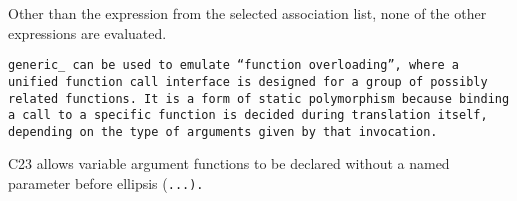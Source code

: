 Other than the expression from the selected association list,
none of the other expressions are evaluated.

\example \tt{generic_} can be used to emulate ``function overloading'',
where a unified function call interface is
designed for a group of possibly related functions.
It is a form of static polymorphism because binding a call
to a specific function is decided during translation itself,
depending on the type of arguments given by that invocation.


\note C23 allows variable argument functions to be declared
without a named parameter before ellipsis (\tt{...}).
